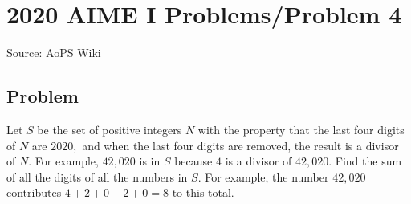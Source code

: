 \documentclass[12pt]{article}
\begin{document}
\section*{{2020 AIME I Problems/Problem 4}}
Source: AoPS Wiki

\subsection*{Problem}
Let $S$ be the set of positive integers $N$ with the property that the last four digits of $N$ are $2020,$ and when the last four digits are removed, the result is a divisor of $N.$ For example, $42,020$ is in $S$ because $4$ is a divisor of $42,020.$ Find the sum of all the digits of all the numbers in $S.$ For example, the number $42,020$ contributes $4+2+0+2+0=8$ to this total.
\end{document}
